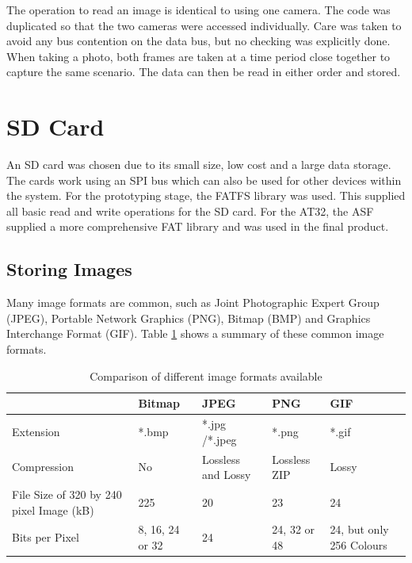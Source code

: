 The operation to read an image is identical to using one camera. The code was duplicated so that the two cameras were accessed individually. Care was taken to avoid any bus contention on the data bus, but no checking was explicitly done. When taking a photo, both frames are taken at a time period close together to capture the same scenario. The data can then be read in either order and stored.

\section{SD Card} \label{sect:SDCard}

An SD card was chosen due to its small size, low cost and a large data storage. 
The cards work using an SPI bus which can also be used for other devices within the system. For the prototyping stage, the FATFS library \citep{FATFS} was used. This supplied all basic read and write operations for the SD card. For the AT32, the ASF supplied a more comprehensive FAT library and was used in the final product.

\subsection{Storing Images}

Many image formats are common, such as Joint Photographic Expert Group (JPEG), Portable Network Graphics (PNG), Bitmap (BMP) and Graphics Interchange Format (GIF). Table \ref{ImageFormats} shows a summary of these common image formats.


\begin{table}
\centering
\caption{Comparison of different image formats available \citep{ImageComparison}}
\label{ImageFormats}
\begin{tabular}{p{3cm}p{2cm}p{2cm}p{2cm}p{2cm}} \toprule
			&	Bitmap 		& 	JPEG			 	&	PNG				& 	GIF \\ \toprule
Extension 		& 	*.bmp 		&  	*.jpg /*.jpeg 		& 	*.png				& 	*.gif \\ \midrule
Compression 	& 	No 			& 	Lossless  and Lossy		&	Lossless ZIP			&	Lossy	\\ \midrule
File Size of 320 by 
240 pixel Image (kB) &	225			&	20				&	23				&	24 \\ \midrule
Bits per Pixel		&	8, 16, 24 or 32	&	24				&	24, 32 or 48 			& 	24, but only 256 Colours \\ \bottomrule
\end{tabular}
\end{table}

